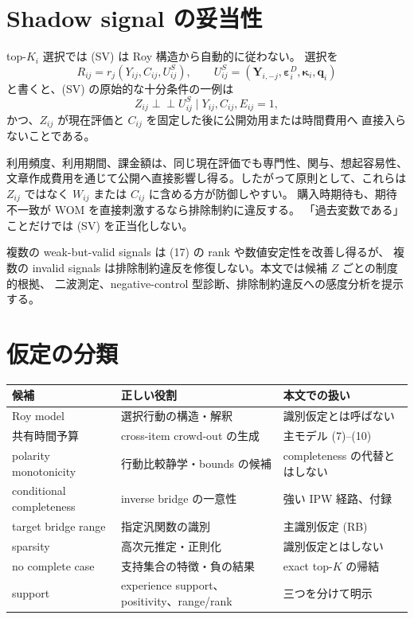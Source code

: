 \documentclass[a4paper,11pt]{ltjsarticle}
\newcommand{\indep}{\mathrel{\perp\!\!\!\perp}}
\newcommand{\1}{\mathbf 1}
\theoremstyle{definition}
\theoremstyle{plain}
\theoremstyle{remark}
\begin{document}
\section{Shadow signal の妥当性}

top-$K_i$ 選択では (SV) は Roy 構造から自動的に従わない。
選択を
\[
 R_{ij}=r_j(Y_{ij},C_{ij},U^S_{ij}),
 \qquad
 U^S_{ij}=(\bm Y_{i,-j},\bm\varepsilon_i^D,\bm\kappa_i,\bm q_i)
 \tag{25}
\]
と書くと、(SV) の原始的な十分条件の一例は
\[
 Z_{ij}\indep U^S_{ij}\mid Y_{ij},C_{ij},E_{ij}=1,
 \tag{26}
\]
かつ、$Z_{ij}$ が現在評価と $C_{ij}$ を固定した後に公開効用または時間費用へ
直接入らないことである。

利用頻度、利用期間、課金額は、同じ現在評価でも専門性、関与、想起容易性、
文章作成費用を通じて公開へ直接影響し得る。したがって原則として、これらは
$Z_{ij}$ ではなく $W_{ij}$ または $C_{ij}$ に含める方が防御しやすい。
購入時期待も、期待不一致が WOM を直接刺激するなら排除制約に違反する。
「過去変数である」ことだけでは (SV) を正当化しない。

複数の weak-but-valid signals は (17) の rank や数値安定性を改善し得るが、
複数の invalid signals は排除制約違反を修復しない。本文では候補 $Z$ ごとの制度的根拠、
二波測定、negative-control 型診断、排除制約違反への感度分析を提示する。

\section{仮定の分類}

\begin{center}
\small
\begin{tabular}{>{\raggedright\arraybackslash}p{31mm}
                >{\raggedright\arraybackslash}p{56mm}
                >{\raggedright\arraybackslash}p{58mm}}
\toprule
候補 & 正しい役割 & 本文での扱い \\
\midrule
Roy model & 選択行動の構造・解釈 & 識別仮定とは呼ばない \\
共有時間予算 & cross-item crowd-out の生成 & 主モデル (7)--(10) \\
polarity monotonicity & 行動比較静学・bounds の候補 & completeness の代替とはしない \\
conditional completeness & inverse bridge の一意性 & 強い IPW 経路、付録 \\
target bridge range & 指定汎関数の識別 & 主識別仮定 (RB) \\
sparsity & 高次元推定・正則化 & 識別仮定とはしない \\
no complete case & 支持集合の特徴・負の結果 & exact top-$K$ の帰結 \\
support & experience support、positivity、range/rank & 三つを分けて明示 \\
\bottomrule
\end{tabular}
\end{center}
\end{document}

